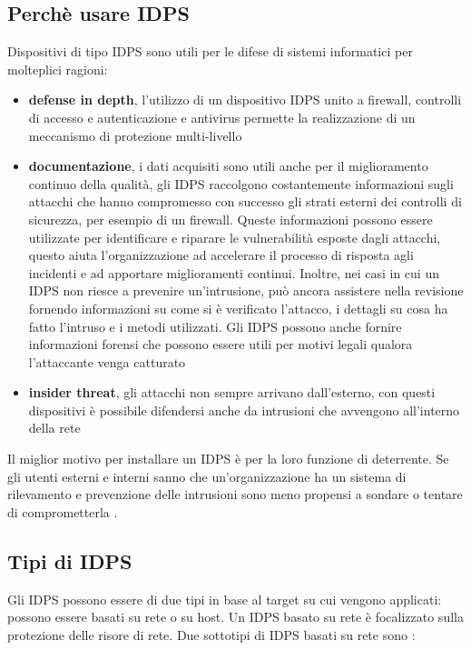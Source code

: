 \documentclass[../main.tex]{subfiles}
\begin{document}
\subsection{Perchè usare IDPS}
Dispositivi di tipo IDPS sono utili per le difese di sistemi informatici per molteplici ragioni:
\begin{itemize}
				\item \textbf{defense in depth}, l'utilizzo di un dispositivo IDPS unito a firewall, controlli di accesso e autenticazione e antivirus permette la realizzazione di un meccanismo di protezione multi-livello
				\item \textbf{documentazione}, i dati acquisiti sono utili anche per il miglioramento continuo della qualità, gli IDPS raccolgono costantemente informazioni sugli attacchi che hanno compromesso con successo gli strati esterni dei controlli di sicurezza, per esempio di un firewall. Queste informazioni possono essere utilizzate per identificare e riparare le vulnerabilità esposte dagli attacchi, questo aiuta l'organizzazione ad accelerare il processo di risposta agli incidenti e ad apportare miglioramenti continui.
								Inoltre, nei casi in cui un IDPS non riesce a prevenire un'intrusione, può ancora assistere nella revisione fornendo informazioni su come si è verificato l'attacco, i dettagli su cosa ha fatto l'intruso e i metodi utilizzati. Gli IDPS possono anche fornire informazioni forensi che possono essere utili per motivi legali qualora l'attaccante venga catturato \cite{IPS}
				\item \textbf{insider threat}, gli attacchi non sempre arrivano dall'esterno, con questi dispositivi è possibile difendersi anche da intrusioni che avvengono all'interno della rete
\end{itemize}

Il miglior motivo per installare un IDPS è per la loro funzione di deterrente. Se gli utenti esterni e interni sanno che un'organizzazione ha un sistema di rilevamento e prevenzione delle intrusioni sono meno propensi a sondare o tentare di comprometterla \cite{IPS}.

\subsection{Tipi di IDPS}
Gli IDPS possono essere di due tipi in base al target su cui vengono applicati: possono essere basati su rete o su host. Un IDPS basato su rete è focalizzato sulla protezione delle risore di rete. Due sottotipi di IDPS basati su rete sono \cite{IPS}:
\end{document}
